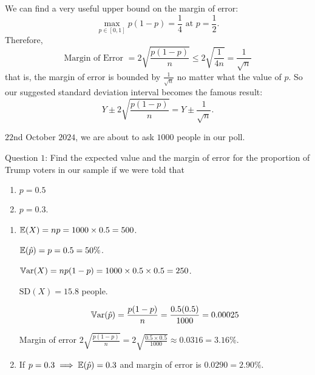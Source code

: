 \documentclass[10pt, a4paper]{article}
\begin{document}
We can find a very useful upper bound on the margin of error:
\[
\max_{p \in [0, 1]}p(1 - p) = \frac{1}{4}\text{ at } p = \frac{1}{2}.
\]
Therefore,
\[
\text{Margin of Error } = 2\sqrt{\frac{p(1 - p)}{n}} \leq 2\sqrt{\frac{1}{4n}} = \frac{1}{\sqrt{n}}
\]
that is,
the margin of error is bounded by $\frac{1}{\sqrt{n}}$ no matter what the value of $p$.
So our suggested standard deviation interval becomes the famous result:
\[
Y \pm 2\sqrt{\frac{p(1 - p)}{n}} = Y \pm \frac{1}{\sqrt{n}}.
\]

\begin{example}
    $22$nd October $2024$,
    we are about to ask $1000$ people in our poll.
    
    Question $1$:
    Find the expected value and the margin of error for the proportion of Trump voters in our sample if we were told that
    \begin{enumerate}[label = (\alph*)]
        \item $p = 0.5$
        \item $p = 0.3$.
    \end{enumerate}
    
    \begin{solution}
        \begin{enumerate}[label = (\alph*)]
            \item
            $\mathbb{E}(X) = np = 1000 \times 0.5 = 500$.
    
            $\mathbb{E}(\hat{p}) = p = 0.5 = 50\%$.
    
            $\mathbb{V}\mathrm{ar}(X) = np(1 - p) = 1000 \times 0.5 \times 0.5 = 250$.
    
            $\mathrm{SD}(X) = 15.8$ people.

            \[
            \mathbb{V}\mathrm{ar}(\hat{p}) = \frac{p(1 - p)}{n} = \frac{0.5(0.5)}{1000} = 0.00025
            \]

            Margin of error $2\sqrt{\frac{p(1 - p)}{n}} = 2\sqrt{\frac{0.5 \times 0.5}{1000}} \approx 0.0316 = 3.16\%$.
            
            \item
            If $p = 0.3 \implies \mathbb{E}(\hat{p}) = 0.3$ and margin of error is $0.0290 = 2.90\%$.
        \end{enumerate}
    \end{solution}
\end{example}
\end{document}
